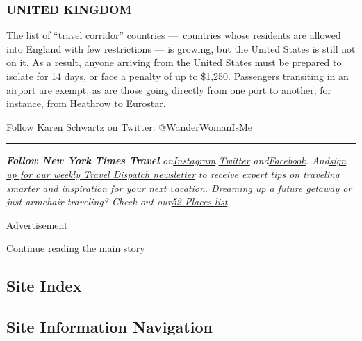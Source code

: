 \hypertarget{united-kingdom}{%
\subsubsection{\texorpdfstring{\href{https://www.gov.uk/uk-border-control}{UNITED
KINGDOM}}{UNITED KINGDOM}}\label{united-kingdom}}

The list of ``travel corridor'' countries ---~countries whose residents
are allowed into England with few restrictions --- is growing, but the
United States is still not on it. As a result, anyone arriving from the
United States must be prepared to isolate for 14 days, or face a penalty
of up to \$1,250. Passengers transiting in an airport are exempt, as are
those going directly from one port to another; for instance, from
Heathrow to Eurostar.

Follow Karen Schwartz on Twitter:
\href{https://twitter.com/wanderwomanisme?lang=en}{@WanderWomanIsMe}

\begin{center}\rule{0.5\linewidth}{\linethickness}\end{center}

\emph{\textbf{Follow New York Times Travel}}
\emph{on}\href{https://www.instagram.com/nytimestravel/}{\emph{Instagram}}\emph{,}\href{https://twitter.com/nytimestravel}{\emph{Twitter}}
\emph{and}\href{https://www.facebookcorewwwi.onion/nytimestravel/}{\emph{Facebook}}\emph{.
And}\href{https://www.nytimes3xbfgragh.onion/newsletters/traveldispatch}{\emph{sign
up for our weekly Travel Dispatch newsletter}} \emph{to receive expert
tips on traveling smarter and inspiration for your next vacation.
Dreaming up a future getaway or just armchair traveling? Check out
our}\href{https://www.nytimes3xbfgragh.onion/interactive/2020/travel/places-to-visit.html}{\emph{52
Places list}}\emph{.}

Advertisement

\protect\hyperlink{after-bottom}{Continue reading the main story}

\hypertarget{site-index}{%
\subsection{Site Index}\label{site-index}}

\hypertarget{site-information-navigation}{%
\subsection{Site Information
Navigation}\label{site-information-navigation}}

